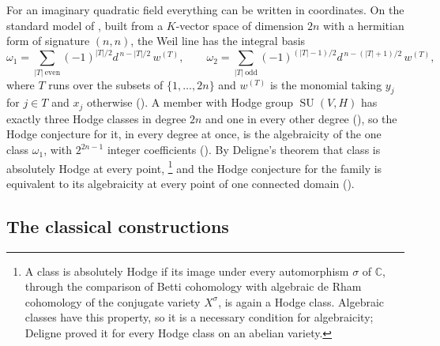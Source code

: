 \documentclass[11pt,reqno]{amsart}
\theoremstyle{plain}
\theoremstyle{definition}
\theoremstyle{remark}
\newcommand{\CC}{\mathbb{C}}
\DeclareMathOperator{\SU}{SU}
\begin{document}
For an imaginary quadratic field everything can be written in coordinates.
On the standard model of , built from a $K$-vector space of
dimension $2n$ with a hermitian form of signature $(n,n)$, the Weil line has
the integral basis
\[
  \omega_{1}=\sum_{|T|\ \mathrm{even}}(-1)^{|T|/2}d^{\,n-|T|/2}\,w^{(T)},
  \qquad
  \omega_{2}=\sum_{|T|\ \mathrm{odd}}(-1)^{(|T|-1)/2}d^{\,n-(|T|+1)/2}\,w^{(T)},
\]
where $T$ runs over the subsets of $\{1,\dots,2n\}$ and $w^{(T)}$ is the
monomial taking $y_{j}$ for $j\in T$ and $x_{j}$ otherwise
(). A member with Hodge group $\SU(V,H)$ has exactly
three Hodge classes in degree $2n$ and one in every other degree
(), so the Hodge conjecture for it, in every degree at
once, is the algebraicity of the one class $\omega_{1}$, with $2^{2n-1}$
integer coefficients (). By Deligne's theorem
\cite{Del82} that class is absolutely Hodge at every point,%
\footnote{A class is absolutely Hodge if its image under every automorphism
$\sigma$ of $\CC$, through the comparison of Betti cohomology with
algebraic de Rham cohomology of the conjugate variety $X^{\sigma}$, is again
a Hodge class. Algebraic classes have this property, so it is a necessary
condition for algebraicity; Deligne proved it for every Hodge class on an
abelian variety.}
and the Hodge
conjecture for the family is equivalent to its algebraicity at every point of
one connected domain ().


\subsection{The classical constructions}
\end{document}
